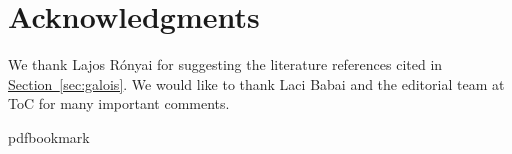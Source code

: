 \documentclass[11pt]{article}
\numberwithin{equation}{section}
\theoremstyle{definition}
\theoremstyle{plain}
\newcommand{\expref}[2]{\hyperref[#2]{#1~\ref{#2}}}
\theoremstyle{definition}
\begin{document}
\section*{Acknowledgments}
We thank Lajos R\'onyai for suggesting 
the literature references
cited in \expref{Section}{sec:galois}.
We would like to thank Laci Babai and the
editorial team at ToC for many important comments.
\nocite{conf-version}


\providecommand{\bibhead}[1]{}
\expandafter\ifx\csname pdfbookmark\endcsname\relax%
  \providecommand{\tocrefpdfbookmark}{}
\else\providecommand{\tocrefpdfbookmark}{%
   \hypertarget{tocreferences}{}%
   \pdfbookmark[1]{References}{tocreferences}}%
\fi
\end{document}
